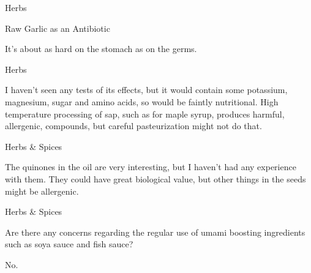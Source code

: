 \documentclass[11pt,oneside,openany,extrafontsizes]{memoir}
\begin{document}
\begin{standalonequote}{Herbs}

    \begin{note}
        Raw Garlic as an Antibiotic
    \end{note}

    \begin{answer}
        It's about as hard on the stomach as on the germs.
    \end{answer}
\end{standalonequote}

\begin{standalonequote}{Herbs}

    \begin{answer}
        I haven't seen any tests of its effects, but it would contain some potassium, magnesium, sugar and amino acids, so would be faintly nutritional. High temperature processing of sap, such as for maple syrup, produces harmful, allergenic, compounds, but careful pasteurization might not do that.
    \end{answer}
\end{standalonequote}

\begin{standalonequote}{Herbs \& Spices}

    \begin{answer}
      The quinones in the oil are very interesting, but I haven't had any experience with them. They could have great biological value, but other things in the seeds might be allergenic.
    \end{answer}
\end{standalonequote}

\begin{qaexchange}{Herbs \& Spices}

    \begin{question}
        Are there any concerns regarding the regular use of umami boosting ingredients such as soya sauce and fish sauce?
    \end{question}

    \begin{answer}
      No.
    \end{answer}
\end{qaexchange}
\end{document}
